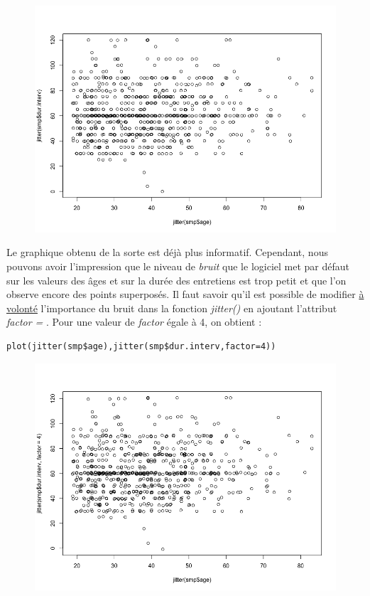 \begin{figure}[H]\begin{center}\includegraphics[scale=0.35]{ilu/cn.png}\end{center}\end{figure}
Le graphique obtenu de la sorte est déjà plus informatif.\newline
Cependant, nous pouvons avoir l'impression que le niveau de \textit{bruit} que le logiciel met par défaut sur les valeurs des âges et sur la durée des entretiens est trop petit et que l'on observe encore des points superposés. Il faut savoir qu'il est possible de modifier \underline{à volonté} l'importance du bruit dans la fonction \textit{jitter()} en ajoutant l'attribut \textit{factor = }.\newline
Pour une valeur de \textit{factor} égale à 4, on obtient : 
\begin{lstlisting}[language=html]
plot(jitter(smp$age),jitter(smp$dur.interv,factor=4))
\end{lstlisting}
\begin{figure}[H]\begin{center}\includegraphics[scale=0.35]{ilu/co.png}\end{center}\end{figure}
